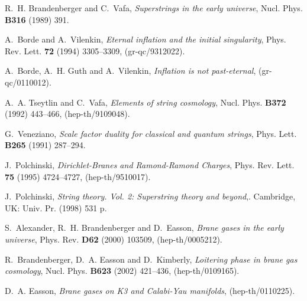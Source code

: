 \documentclass[a4paper,twocolumn,nofootinbib,tightenlines,prd,aps,
               superscriptaddress]{revtex4} %
\begin{document}
\providecommand{\href}[2]{#2}\begingroup\raggedright\begin{thebibliography}{10}

R.~H. Brandenberger and C.~Vafa, {\em Superstrings in the early
universe},
  Nucl. Phys. {\bf B316} (1989)
391.

A.~Borde and A.~Vilenkin, {\em Eternal inflation and the initial
singularity},
  Phys. Rev. Lett. {\bf 72} (1994) 3305--3309,
(\href{http://arXiv.org/abs/gr-qc/9312022}{gr-qc/9312022}).

A.~Borde, A.~H. Guth  and A.~Vilenkin, {\em Inflation is not
past-eternal},
(\href{http://arXiv.org/abs/gr-qc/0110012}{gr-qc/0110012}).

A.~A. Tseytlin and C.~Vafa, {\em Elements of string cosmology},
Nucl. Phys.
  {\bf B372} (1992) 443--466,
(\href{http://arXiv.org/abs/hep-th/9109048}{hep-th/9109048}).

G.~Veneziano, {\em Scale factor duality for classical and quantum
strings},
  Phys. Lett. {\bf B265} (1991)
287--294.

J.~Polchinski, {\em Dirichlet-Branes and Ramond-Ramond Charges},
Phys. Rev.
  Lett. {\bf 75} (1995) 4724--4727,
(\href{http://arXiv.org/abs/hep-th/9510017}{hep-th/9510017}).

J.~Polchinski, {\em String theory. Vol. 2: Superstring theory and
beyond},.
  Cambridge, UK: Univ. Pr. (1998) 531 p.

S.~Alexander, R.~H. Brandenberger  and D.~Easson, {\em Brane gases
in the early
  universe}, Phys. Rev. {\bf D62} (2000) 103509,
(\href{http://arXiv.org/abs/hep-th/0005212}{hep-th/0005212}).

R.~Brandenberger, D.~A. Easson  and D.~Kimberly, {\em Loitering
phase in brane
  gas cosmology}, Nucl. Phys. {\bf B623} (2002) 421--436,
(\href{http://arXiv.org/abs/hep-th/0109165}{hep-th/0109165}).

D.~A. Easson, {\em Brane gases on K3 and Calabi-Yau manifolds},
(\href{http://arXiv.org/abs/hep-th/0110225}{hep-th/0110225}).


\end{thebibliography}
\end{document}
